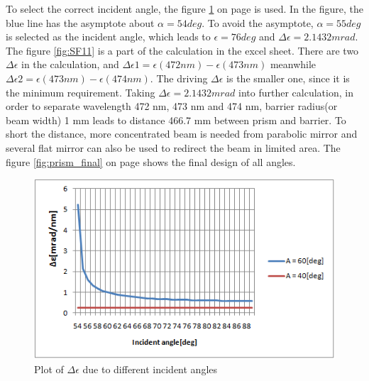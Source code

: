 To select the correct incident angle, the figure \ref{fig:prism_alpha} on page \pageref{fig:prism_alpha} is used. In the figure, the blue line has the asymptote about $\alpha = 54 deg$. To avoid the asymptote, $\alpha = 55 deg$ is selected as the incident angle, which leads to $\epsilon = 76 deg$ and $\Delta\epsilon = 2.1432 mrad$. The figure \ref{fig:SF11} is a part of the calculation in the excel sheet. There are two $\Delta\epsilon$ in the calculation, and $\Delta\epsilon1 = \epsilon(472 nm) - \epsilon(473 nm)$ meanwhile $\Delta\epsilon2 = \epsilon(473 nm) - \epsilon(474 nm)$. The driving $\Delta\epsilon$ is the smaller one, since it is the minimum requirement. Taking $\Delta\epsilon = 2.1432 mrad$ into further calculation, in order to separate wavelength 472 nm, 473 nm and 474 nm, barrier radius(or beam width) 1 mm leads to distance 466.7 mm between prism and barrier. To short the distance, more concentrated beam is needed from parabolic mirror and several flat mirror can also be used to redirect the beam in limited area. The figure \ref{fig:prism_final} on page \pageref{fig:prism_final} shows the final design of all angles.

\begin{figure}[ht!]
\centering
\includegraphics[scale = 1.2]{chapters/img/prism_alpha.png}
\caption{Plot of $\Delta\epsilon$ due to different incident angles}
\label{fig:prism_alpha}
\end{figure}


